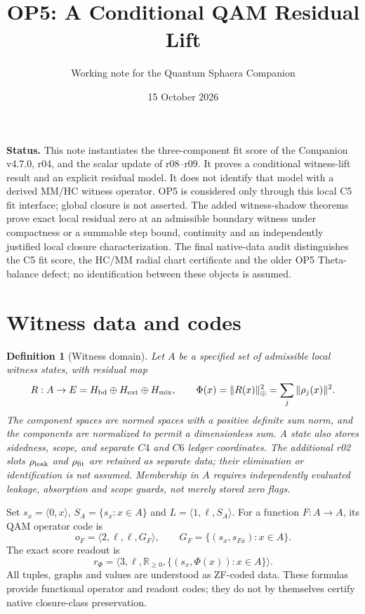 \documentclass[11pt,a4paper]{article}
\title{OP5: A Conditional QAM Residual Lift}
\author{Working note for the Quantum Sphaera Companion}
\date{15 October 2026}
\newtheorem{definition}{Definition}
\begin{document}
\maketitle
\noindent\textbf{Status.} This note instantiates the three-component fit score
of the Companion v4.7.0, r04, and the scalar update of r08--r09. It proves a
conditional witness-lift result and an explicit residual model. It does not
identify that model with a derived MM/HC witness operator. OP5 is considered
only through this local C5 fit interface; global closure is not asserted.
The added witness-shadow theorems prove exact local residual zero at an
admissible boundary witness under compactness or a summable step bound,
continuity and an independently justified local closure characterization.
The final native-data audit distinguishes the C5 fit score, the HC/MM radial
chart certificate and the older OP5 Theta-balance defect; no identification
between these objects is assumed.

\section{Witness data and codes}
\begin{definition}[Witness domain]
Let $A$ be a specified set of admissible local witness states, with residual map
\[
R:A\to E=H_{\rm bd}\oplus H_{\rm ext}\oplus H_{\rm mix},\qquad
\Phi(x)=\|R(x)\|_\oplus^2=\sum_j\|\rho_j(x)\|^2.
\]
The component spaces are normed spaces with a positive definite sum norm, and
the components are normalized to permit a dimensionless sum. A state also
stores sidedness, scope, and separate $C4$ and $C6$ ledger coordinates.
The additional r02 slots $\rho_{\rm leak}$ and $\rho_{\rm fit}$ are retained
as separate data; their elimination or identification is not assumed.
Membership in $A$ requires independently evaluated leakage, absorption and
scope guards, not merely stored zero flags.
\end{definition}

Set $s_x=\langle0,x\rangle$, $S_A=\{s_x:x\in A\}$ and
$L=\langle1,\ell,S_A\rangle$. For a function $F:A\to A$, its QAM operator
code is
\[
o_F=\langle2,\ell,\ell,G_F\rangle,\qquad
G_F=\{(s_x,s_{Fx}):x\in A\}.
\]
The exact score readout is
\[
r_\Phi=\langle3,\ell,\mathbb R_{\ge0},
\{(s_x,\Phi(x)):x\in A\}\rangle.
\]
All tuples, graphs and values are understood as ZF-coded data. These formulas
provide functional operator and readout codes; they do not by themselves
certify native closure-class preservation.
\end{document}
